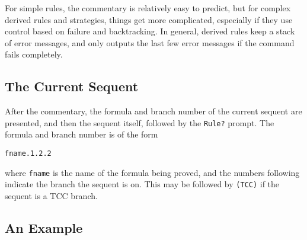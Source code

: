 \documentclass[12pt]{book}
\begin{document}
For simple rules, the commentary is relatively easy to predict, but for
complex derived rules and strategies, things get more complicated,
especially if they use control based on failure and backtracking.  In
general, derived rules keep a stack of error messages, and only outputs
the last few error messages if the command fails completely.

\subsection{The Current Sequent}

After the commentary, the formula and branch number of the current sequent
are presented, and then the sequent itself, followed by the \texttt{Rule?}
prompt.  The formula and branch number is of the form
\begin{alltt}
  fname.1.2.2
\end{alltt}
where \texttt{fname} is the name of the formula being proved, and the
numbers following indicate the branch the sequent is on.  This may be
followed by \texttt{(TCC)} if the sequent is a TCC branch.

\subsection{An Example}
\end{document}
